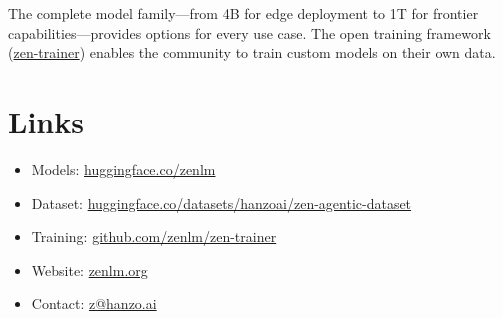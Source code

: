 \documentclass[11pt,a4paper]{article}
\begin{document}
The complete model family---from 4B for edge deployment to 1T for frontier capabilities---provides
options for every use case. The open training framework (\href{https://github.com/zenlm/zen-trainer}{zen-trainer})
enables the community to train custom models on their own data.

\section*{Links}

\begin{itemize}
    \item Models: \href{https://huggingface.co/zenlm}{huggingface.co/zenlm}
    \item Dataset: \href{https://huggingface.co/datasets/hanzoai/zen-agentic-dataset}{huggingface.co/datasets/hanzoai/zen-agentic-dataset}
    \item Training: \href{https://github.com/zenlm/zen-trainer}{github.com/zenlm/zen-trainer}
    \item Website: \href{https://zenlm.org}{zenlm.org}
    \item Contact: \href{mailto:z@hanzo.ai}{z@hanzo.ai}
\end{itemize}
\end{document}
